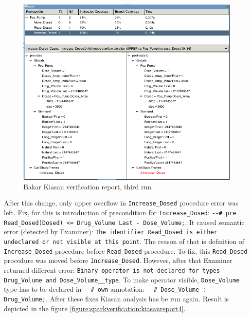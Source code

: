 \begin{figure}[ht]%
    \begin{center}
        \includegraphics[width=1.0\textwidth]{figures/pca-pump-verification-step3.png}
        \caption{Bakar Kiasan verification report, third run}
    \end{center}
    \label{figure:sparkverification:kiasanreport3}
\end{figure}

After this change, only upper overflow in \lstinline{Increase_Dosed} procedure error was left. Fix, for this is introduction of precondition for \lstinline{Increase_Dosed}: \lstinline{--# pre Read_Dosed(Dosed) <= Drug_Volume'Last - Dose_Volume;}. It caused semantic error (detected by Examiner): \lstinline{The identifier Read_Dosed is either undeclared or not visible at this point}. The reason of that is definition of \lstinline{Increase_Dosed} procedure before \lstinline{Read_Dosed} procedure. To fix, this \lstinline{Read_Dosed} procedure was moved before \lstinline{Increase_Dosed}. However, after that Examiner returned different error: \lstinline{Binary operator is not declared for types Drug_Volume and Dose_Volume__type}. To make operator visible, \lstinline{Dose_Volume} type has to be declared in \lstinline{--# own} annotation: \lstinline{--# Dose_Volume : Drug_Volume;}. After these fixes Kiasan analysis has be run again. Result is depicted in the figure \ref{figure:sparkverification:kiasanreport4}.

